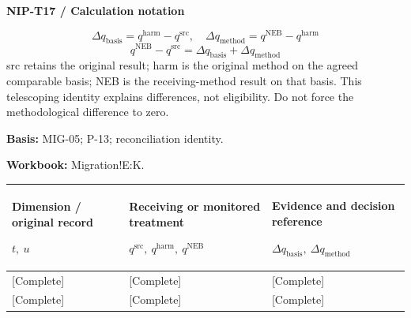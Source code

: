 \Needspace{112mm}
\par\begingroup\sffamily\fontsize{8}{10}\selectfont\color{NEBGreen}\setlength{\parskip}{2pt}\setlength{\abovedisplayskip}{4pt}\setlength{\belowdisplayskip}{4pt}\setlength{\abovedisplayshortskip}{2pt}\setlength{\belowdisplayshortskip}{3pt}
\textbf{NIP-T17 / Calculation notation}\par
{\fontsize{9}{11}\selectfont\[ \Delta q_{\mathrm{basis}}=q^{\mathrm{harm}}-q^{\mathrm{src}},\quad \Delta q_{\mathrm{method}}=q^{\mathrm{NEB}}-q^{\mathrm{harm}} \]}
{\fontsize{9}{11}\selectfont\[ q^{\mathrm{NEB}}-q^{\mathrm{src}}=\Delta q_{\mathrm{basis}}+\Delta q_{\mathrm{method}} \]}
src retains the original result; harm is the original method on the agreed comparable basis; NEB is the receiving-method result on that basis. This telescoping identity explains differences, not eligibility. Do not force the methodological difference to zero.\par
\textbf{Basis:} MIG-05; P-13; reconciliation identity.\par
\textbf{Workbook:} Migration!E:K.\par\endgroup
{\sffamily\fontsize{8.3}{10.3}\selectfont\begin{longtable}{@{}P{54.83mm} P{54.83mm} P{54.83mm}@{}}
\toprule
\textbf{Dimension / original record}\par {\normalfont\fontsize{8.2}{10}\selectfont $t,\ u$} & \textbf{Receiving or monitored treatment}\par {\normalfont\fontsize{8.2}{10}\selectfont $q^{\mathrm{src}},\ q^{\mathrm{harm}},\ q^{\mathrm{NEB}}$} & \textbf{Evidence and decision reference}\par {\normalfont\fontsize{8.2}{10}\selectfont $\Delta q_{\mathrm{basis}},\ \Delta q_{\mathrm{method}}$}\\\midrule\endhead
\rule{0pt}{8mm}[Complete] & [Complete] & [Complete]\\\hline
\rule{0pt}{8mm}[Complete] & [Complete] & [Complete]\\\hline
\end{longtable}}

